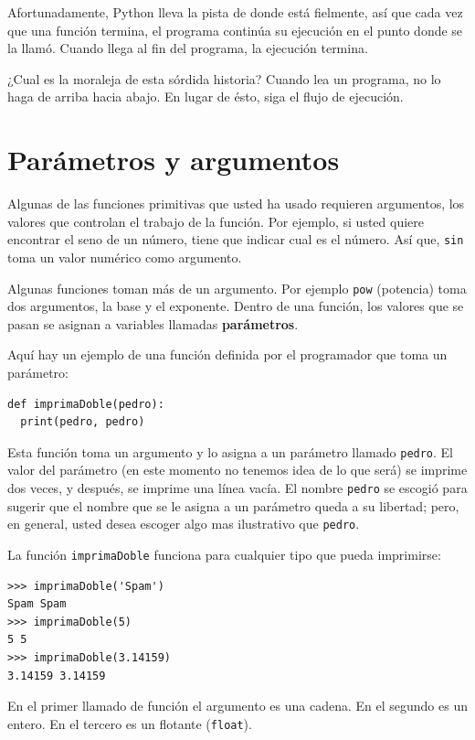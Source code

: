 Afortunadamente, Python lleva la pista de donde está fielmente, así
que cada vez que una función termina, el programa continúa su ejecución
en el punto donde se la llamó. Cuando llega al fin del programa, la
ejecución termina.

¿Cual es la moraleja de esta sórdida historia? Cuando lea un programa,
no lo haga de arriba hacia abajo. En lugar de ésto, siga el flujo
de ejecución.

\section{Parámetros y argumentos}

\label{parameters}  
 

Algunas de las funciones primitivas que usted ha usado requieren argumentos,
los valores que controlan el trabajo de la función. Por ejemplo, si
usted quiere encontrar el seno de un número, tiene que indicar cual
es el número. Así que, \texttt{sin} toma un valor numérico como argumento.

Algunas funciones toman más de un argumento. Por ejemplo \texttt{pow}
(potencia) toma dos argumentos, la base y el exponente. Dentro de
una función, los valores que se pasan se asignan a variables llamadas
\textbf{parámetros}.

Aquí hay un ejemplo de una función definida por el programador que
toma un parámetro:

\begin{lstlisting}
def imprimaDoble(pedro):
  print(pedro, pedro)
\end{lstlisting}
 Esta función toma un argumento y lo asigna a un parámetro llamado
\texttt{pedro}. El valor del parámetro (en este momento no tenemos
idea de lo que será) se imprime dos veces, y después, se imprime una
línea vacía. El nombre \texttt{pedro} se escogió para sugerir que
el nombre que se le asigna a un parámetro queda a su libertad; pero,
en general, usted desea escoger algo mas ilustrativo que \texttt{pedro}.

La función \texttt{imprimaDoble} funciona para cualquier tipo que
pueda imprimirse:

\begin{lstlisting}
>>> imprimaDoble('Spam')
Spam Spam
>>> imprimaDoble(5)
5 5
>>> imprimaDoble(3.14159)
3.14159 3.14159
\end{lstlisting}
 En el primer llamado de función el argumento es una cadena. En el
segundo es un entero. En el tercero es un flotante (\texttt{float}).

